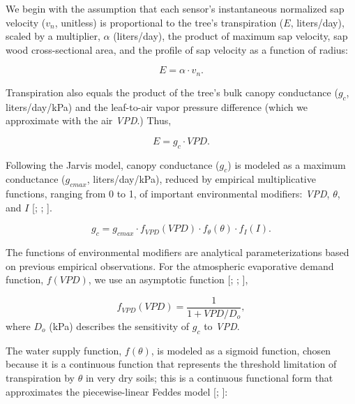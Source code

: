 We begin with the assumption that each sensor's instantaneous normalized sap velocity ($v_n$, unitless) is proportional to the tree's transpiration ($E$, liters/day), scaled by a multiplier, $\alpha$ (liters/day), the product of maximum sap velocity, sap wood cross-sectional area, and the profile of sap velocity as a function of radius:

\begin{equation} %
\label{eqn:sf1}
E = \alpha \cdot v_n.
\end{equation}

Transpiration also equals the product of the tree's bulk canopy conductance ($g_c$, liters/day/kPa) and the leaf-to-air vapor pressure difference (which we approximate with the air \textit{VPD}.)  Thus,

\begin{equation} %
E = g_c \cdot VPD.
\end{equation}

Following the Jarvis model, canopy conductance ($g_c$) is modeled as a maximum conductance ($g_{cmax}$, liters/day/kPa), reduced by empirical multiplicative functions, ranging from 0 to 1, of important environmental modifiers: \textit{VPD}, $\theta$, and $I$ [\cite{jarvis1976interpretation}; \cite{oren1999survey}; \cite{waring2011generalizing}].

\begin{equation}  %
\label{eqn:sapflow_jarvis_simple}
g_c = g_{cmax} \cdot f_{VPD}(VPD) \cdot f_{\theta}(\theta) \cdot f_I(I).
\end{equation}

The functions of environmental modifiers are analytical parameterizations based on previous empirical observations.  For the atmospheric evaporative demand function, $f(VPD)$, we use an asymptotic function [\cite{lohammar1980fast}; \cite{lindroth1986numerical}; \cite{dang1997regulation}],

\begin{equation}  %
\label{eqn:sapflow_fVPD}
f_{VPD}(VPD) = \frac{1}{1+VPD/D_o},
\end{equation}
where $D_o$ (kPa) describes the sensitivity of $g_c$ to \textit{VPD}.

The water supply function, $f(\theta)$, is modeled as a sigmoid function, chosen because it is a continuous function that represents the threshold limitation of transpiration by $\theta$ in very dry soils; this is a continuous functional form that approximates the piecewise-linear Feddes model [\cite{feddes}; \cite{chen2008observations}]:

